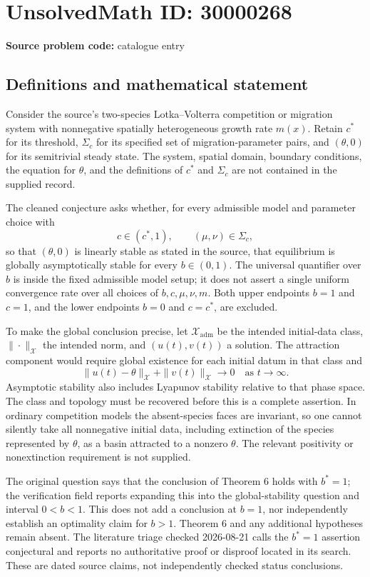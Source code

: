 \documentclass[11pt]{article}
\begin{document}
\section*{UnsolvedMath ID: 30000268}
\textbf{Source problem code:} catalogue entry
\subsection{Definitions and mathematical statement}
Consider the source's two-species Lotka--Volterra competition or migration system with nonnegative spatially heterogeneous growth rate \(m(x)\). Retain \(c^*\) for its threshold, \(\Sigma_c\) for its specified set of migration-parameter pairs, and \((\theta,0)\) for its semitrivial steady state. The system, spatial domain, boundary conditions, the equation for \(\theta\), and the definitions of \(c^*\) and \(\Sigma_c\) are not contained in the supplied record.

The cleaned conjecture asks whether, for every admissible model and parameter choice with
\[
 c\in(c^*,1),\qquad (\mu,\nu)\in\Sigma_c,
\]
so that \((\theta,0)\) is linearly stable as stated in the source, that equilibrium is globally asymptotically stable for every \(b\in(0,1)\). The universal quantifier over \(b\) is inside the fixed admissible model setup; it does not assert a single uniform convergence rate over all choices of \(b,c,\mu,\nu,m\). Both upper endpoints \(b=1\) and \(c=1\), and the lower endpoints \(b=0\) and \(c=c^*\), are excluded.

To make the global conclusion precise, let \(\mathcal X_{\mathrm{adm}}\) be the intended initial-data class, \(\|\cdot\|_{\mathcal X}\) the intended norm, and \((u(t),v(t))\) a solution. The attraction component would require global existence for each initial datum in that class and
\[
 \|u(t)-\theta\|_{\mathcal X}+\|v(t)\|_{\mathcal X}\longrightarrow0
 \quad\text{as }t\to\infty.
\]
Asymptotic stability also includes Lyapunov stability relative to that phase space. The class and topology must be recovered before this is a complete assertion. In ordinary competition models the absent-species faces are invariant, so one cannot silently take all nonnegative initial data, including extinction of the species represented by \(\theta\), as a basin attracted to a nonzero \(\theta\). The relevant positivity or nonextinction requirement is not supplied.

The original question says that the conclusion of Theorem 6 holds with \(b^*=1\); the verification field reports expanding this into the global-stability question and interval \(0<b<1\). This does not add a conclusion at \(b=1\), nor independently establish an optimality claim for \(b>1\). Theorem 6 and any additional hypotheses remain absent. The literature triage checked 2026-08-21 calls the \(b^*=1\) assertion conjectural and reports no authoritative proof or disproof located in its search. These are dated source claims, not independently checked status conclusions.
\end{document}

